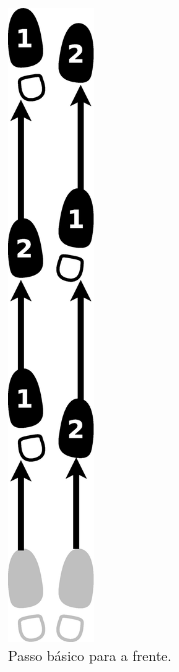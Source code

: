 \begin{itemize}
\begin{figure}[h]
\begin{subfigure}[b]{0.4\textwidth}
        \includegraphics[width=0.25\textwidth]{chapters/cap-historia-sambagafieira/samba-cancao-basico-frente.eps}
        \caption{Passo básico para a frente.}
        \label{fig:samba-cancao-basico-frente}
    \end{subfigure}
    ~ %
    \begin{subfigure}[b]{0.4\textwidth}

\end{subfigure}
\end{figure}
\end{itemize}
